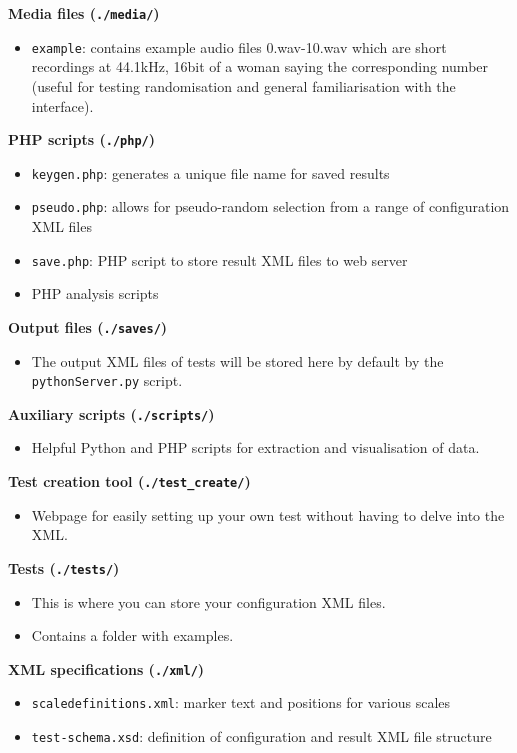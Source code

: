 \documentclass[11pt, oneside]{article}   	%
\begin{document}
         \textbf{Media files (\texttt{./media/})}
          	\begin{itemize}
              	\item \texttt{example}: contains example audio files 0.wav-10.wav which are short recordings at 44.1kHz, 16bit of a woman saying the corresponding number (useful for testing randomisation and general familiarisation with the interface).
          	\end{itemize}
        \textbf{PHP scripts (\texttt{./php/})}
        	\begin{itemize}
        		\item \texttt{keygen.php}: generates a unique file name for saved results
            	\item \texttt{pseudo.php}: allows for pseudo-random selection from a range of configuration XML files
				\item \texttt{save.php}: PHP script to store result XML files to web server
        		\item PHP analysis scripts %
        	\end{itemize}
        \textbf{Output files (\texttt{./saves/})}
        	\begin{itemize}
        		\item The output XML files of tests will be stored here by default by the \texttt{pythonServer.py} script.\\ 
        	\end{itemize}
        \textbf{Auxiliary scripts (\texttt{./scripts/})}
        	\begin{itemize}
        		\item Helpful Python and PHP scripts for extraction and visualisation of data.\\ 
        	\end{itemize}
        \textbf{Test creation tool (\texttt{./test\_create/})}
        	\begin{itemize}
        		\item Webpage for easily setting up your own test without having to delve into the XML.\\ 
        	\end{itemize}
        \textbf{Tests (\texttt{./tests/})}
        	\begin{itemize}
        		\item This is where you can store your configuration XML files.
        		\item Contains a folder with examples.\\  %
        	\end{itemize}
        \textbf{XML specifications (\texttt{./xml/})}
        	\begin{itemize}
        		\item \texttt{scaledefinitions.xml}: marker text and positions for various scales
            	\item \texttt{test-schema.xsd}: definition of configuration and result XML file structure\\  %
        	\end{itemize}
\end{document}
